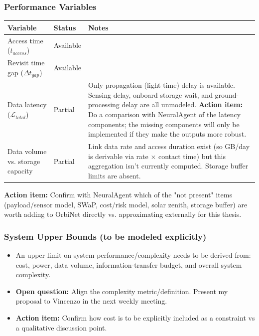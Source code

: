 \documentclass[11pt]{article}
\newcommand{\openquestion}[1]{\textcolor{openq}{\textbf{Open question:}} #1}
\newcommand{\actionitem}[1]{\textcolor{todo}{\textbf{Action item:}} #1}
\begin{document}
\subsubsection{Performance Variables}

\begin{longtable}{p{4cm}p{2.3cm}p{7.4cm}}
\toprule
\textbf{Variable} & \textbf{Status} & \textbf{Notes} \\
\midrule
\endhead
Access time ($t_{access}$) & Available & \\
Revisit time gap ($\Delta t_{gap}$) & Available & \\
Data latency ($\mathcal{L}_{total}$) & Partial & Only propagation (light-time) delay is available. Sensing delay, onboard storage wait, and ground-processing delay are all unmodeled. \actionitem{Do a comparison with NeuralAgent of the latency components; the missing components will only be implemented if they make the outputs more robust.} \\
Data volume vs. storage capacity & Partial & Link data rate and access duration exist (so GB/day is derivable via rate $\times$ contact time) but this aggregation isn't currently computed. Storage buffer limits are absent. \\
\bottomrule
\end{longtable}

\actionitem{Confirm with NeuralAgent which of the "not present" items (payload/sensor model, SWaP, cost/risk model, solar zenith, storage buffer) are worth adding to OrbiNet directly vs. approximating externally for this thesis.}

\subsubsection{System Upper Bounds (to be modeled explicitly)}
\begin{itemize}[leftmargin=1.2cm]
    \item An upper limit on system performance/complexity needs to be derived from: cost, power, data volume, information-transfer budget, and overall system complexity.
    \item \openquestion{Align the complexity metric/definition. Present my proposal to Vincenzo in the next weekly meeting.}
    \item \actionitem{Confirm how cost is to be explicitly included as a constraint vs a qualitative discussion point.}
\end{itemize}

\end{document}
